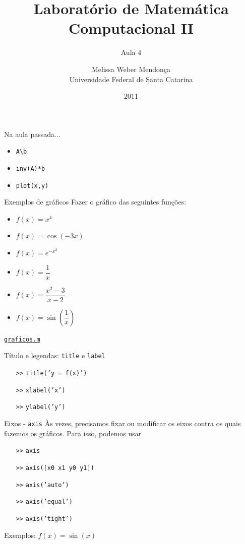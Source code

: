 \documentclass[hyperref={pdfpagelabels=false}]{beamer}
\title{Laboratório de Matemática Computacional II}
\subtitle{Aula 4}
\author[M. Weber Mendonça]{Melissa Weber Mendonça\\
Universidade Federal de Santa Catarina}
\date{2011}
\begin{document}
\setmonofont{Inconsolata}

\begin{frame}
  \titlepage
\end{frame}

\begin{frame}{Na aula passada...}
   \begin{itemize}
      \item {\texttt{A\textbackslash b}}
      \item {\texttt{inv(A)*b}}
      \item {\texttt{plot(x,y)}}
   \end{itemize}
\end{frame}

\begin{frame}{Exemplos de gráficos}
   Fazer o gráfico das seguintes funções:
   \vfill
   \begin{itemize}
      \item $f(x) = x^4$
      \item $f(x) = \cos{(-3x)}$
      \item $f(x) = e^{-x^2}$
      \item $f(x) = \dfrac{1}{x}$
      \item $f(x) = \dfrac{x^2-3}{x-2}$
      \item $f(x) = \sin{\left(\dfrac{1}{x}\right)}$
   \end{itemize}
   \begin{center}
     \href{listings/graficos.m}{\underline{\texttt{graficos.m}}}
   \end{center}
\end{frame}

\begin{frame}{Título e legendas: {\texttt{title}} e {\texttt{label}}}
  \begin{itemize}
  \item[{\texttt{>>}}] {\texttt{title('y = f(x)')}}
  \item[{\texttt{>>}}] {\texttt{xlabel('x')}}
  \item[{\texttt{>>}}] {\texttt{ylabel('y')}}
  \end{itemize}
\end{frame}

\begin{frame}{Eixos - {\texttt{axis}}}
  Às vezes, precisamos fixar ou modificar os eixos contra os quais fazemos os gráficos. Para isso, podemos usar
  \vfill
  \begin{itemize}
  \item[{\texttt{>>}}] {\texttt{axis}}
  \item[{\texttt{>>}}] {\texttt{axis([x0 x1 y0 y1])}}
  \item[{\texttt{>>}}] {\texttt{axis('auto')}}
  \item[{\texttt{>>}}] {\texttt{axis('equal')}}
  \item[{\texttt{>>}}] {\texttt{axis('tight')}}
  \end{itemize}
  \vfill
  
  Exemplos: $f(x) = \sin{(x)}$
\end{frame}
\end{document}
